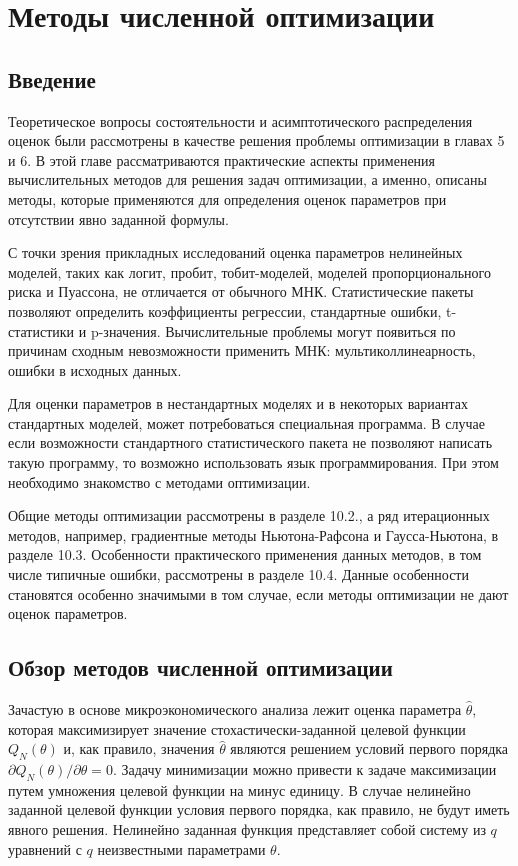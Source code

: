 
\chapter {Методы численной оптимизации}
\section{Введение}
Теоретическое вопросы  состоятельности и асимптотического распределения оценок были рассмотрены в качестве решения проблемы оптимизации в главах 5 и 6. В этой главе рассматриваются практические аспекты применения вычислительных методов для решения задач оптимизации, а именно, описаны методы, которые применяются для определения оценок параметров при отсутствии явно заданной формулы.


С точки зрения прикладных исследований оценка параметров нелинейных моделей, таких как логит, пробит, тобит-моделей, моделей пропорционального риска и Пуассона, не отличается от обычного МНК. Статистические пакеты позволяют определить коэффициенты регрессии, стандартные ошибки, t-статистики и p-значения. Вычислительные проблемы могут появиться по причинам сходным невозможности применить МНК:  мультиколлинеарность, ошибки в исходных данных.

Для оценки параметров в нестандартных моделях и в некоторых вариантах стандартных моделей, может потребоваться специальная программа. В случае если возможности стандартного статистического пакета не позволяют написать такую программу, то возможно использовать язык программирования. При этом необходимо знакомство с методами оптимизации.


Общие методы оптимизации рассмотрены в разделе 10.2., а ряд итерационных методов, например, градиентные методы Ньютона-Рафсона и Гаусса-Ньютона, в разделе 10.3. Особенности практического применения данных методов, в том числе типичные ошибки, рассмотрены в разделе 10.4. Данные особенности становятся особенно значимыми в том случае, если методы оптимизации не дают оценок параметров.

\section{Обзор методов численной оптимизации}

Зачастую в основе микроэкономического анализа лежит оценка параметра $\hat{\theta}$, которая максимизирует значение стохастически-заданной целевой функции $Q_{N}(\theta)$ и, как правило, значения $\hat{\theta}$ являются решением условий первого порядка $\partial{Q_{N}(\theta)}/\partial\theta=0$. Задачу минимизации можно привести к задаче максимизации путем умножения целевой функции на минус единицу. В случае нелинейно заданной целевой функции условия первого порядка, как правило, не будут иметь явного решения. Нелинейно заданная функция представляет собой систему из $q$ уравнений с $q$ неизвестными параметрами $\theta$.

